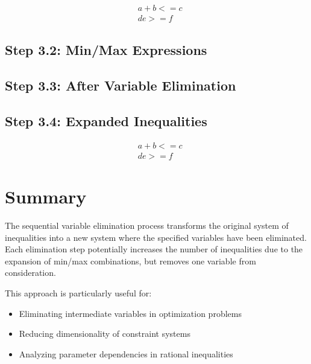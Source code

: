 \documentclass{article}
\begin{document}
\begin{align}
& a + b <= c \\
& d e >= f
\end{align}

\subsection{Step 3.2: Min/Max Expressions}

\subsection{Step 3.3: After Variable Elimination}

\subsection{Step 3.4: Expanded Inequalities}

\begin{align}
& a + b <= c \\
& d e >= f
\end{align}


\section{Summary}

The sequential variable elimination process transforms the original system of inequalities 
into a new system where the specified variables have been eliminated. Each elimination 
step potentially increases the number of inequalities due to the expansion of min/max 
combinations, but removes one variable from consideration.

This approach is particularly useful for:
\begin{itemize}
\item Eliminating intermediate variables in optimization problems
\item Reducing dimensionality of constraint systems
\item Analyzing parameter dependencies in rational inequalities
\end{itemize}
\end{document}
